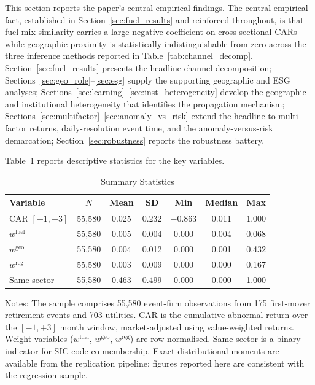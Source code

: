 \documentclass[12pt,a4paper]{article}
\begin{document}
This section reports the paper's central empirical findings. The central empirical fact, established in Section~\ref{sec:fuel_results} and reinforced throughout, is that fuel-mix similarity carries a large negative coefficient on cross-sectional CARs while geographic proximity is statistically indistinguishable from zero across the three inference methods reported in Table~\ref{tab:channel_decomp}. Section~\ref{sec:fuel_results} presents the headline channel decomposition; Sections~\ref{sec:geo_role}--\ref{sec:esg} supply the supporting geographic and ESG analyses; Sections~\ref{sec:learning}--\ref{sec:inst_heterogeneity} develop the geographic and institutional heterogeneity that identifies the propagation mechanism; Sections~\ref{sec:multifactor}--\ref{sec:anomaly_vs_risk} extend the headline to multi-factor returns, daily-resolution event time, and the anomaly-versus-risk demarcation; Section~\ref{sec:robustness} reports the robustness battery.

Table~\ref{tab:summary_stats} reports descriptive statistics for the key variables.

\begin{table}[H]
\centering
\caption{Summary Statistics}
\label{tab:summary_stats}
\begin{tabular}{lcccccc}
\toprule
Variable & $N$ & Mean & SD & Min & Median & Max \\
\midrule
CAR $[-1, +3]$ & 55{,}580 & 0.025 & 0.232 & $-$0.863 & 0.011 & 1.000 \\
$w^{\text{fuel}}$ & 55{,}580 & 0.005 & 0.004 & 0.000 & 0.004 & 0.068 \\
$w^{\text{geo}}$ & 55{,}580 & 0.004 & 0.012 & 0.000 & 0.001 & 0.432 \\
$w^{\text{reg}}$ & 55{,}580 & 0.003 & 0.009 & 0.000 & 0.000 & 0.167 \\
Same sector & 55{,}580 & 0.463 & 0.499 & 0.000 & 0.000 & 1.000 \\
\bottomrule
\end{tabular}
\begin{flushleft}\footnotesize
Notes: The sample comprises 55{,}580 event-firm observations from 175 first-mover retirement events and 703 utilities. CAR is the cumulative abnormal return over the $[-1, +3]$ month window, market-adjusted using value-weighted returns. Weight variables ($w^{\text{fuel}}$, $w^{\text{geo}}$, $w^{\text{reg}}$) are row-normalised. Same sector is a binary indicator for SIC-code co-membership. Exact distributional moments are available from the replication pipeline; figures reported here are consistent with the regression sample.
\end{flushleft}
\end{table}
\end{document}
